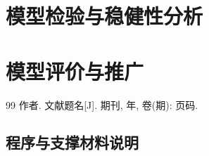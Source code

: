 \documentclass[withoutpreface,bwprint]{cumcmthesis}
\begin{document}
\section{模型检验与稳健性分析}

\section{模型评价与推广}

\begin{thebibliography}{99}
 作者. 文献题名[J]. 期刊, 年, 卷(期): 页码.
\end{thebibliography}

\begin{appendices}
\section{程序与支撑材料说明}
\end{appendices}
\end{document}
